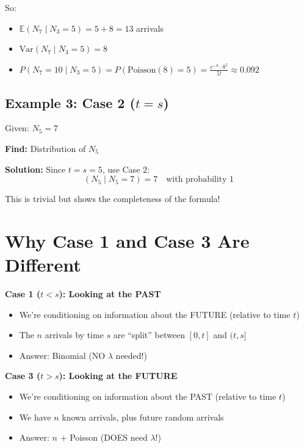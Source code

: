 \documentclass[11pt]{article}
\begin{document}
So:
\begin{itemize}
    \item $\mathbb{E}(N_7 \mid N_3 = 5) = 5 + 8 = 13$ arrivals
    \item $\text{Var}(N_7 \mid N_3 = 5) = 8$
    \item $P(N_7 = 10 \mid N_3 = 5) = P(\text{Poisson}(8) = 5) = \frac{e^{-8} \cdot 8^5}{5!} \approx 0.092$
\end{itemize}

\subsection{Example 3: Case 2 ($t = s$)}

Given: $N_5 = 7$

\textbf{Find:} Distribution of $N_5$

\textbf{Solution:} Since $t = s = 5$, use Case 2:
\[
(N_5 \mid N_5 = 7) = 7 \quad \text{with probability 1}
\]

This is trivial but shows the completeness of the formula!

\section{Why Case 1 and Case 3 Are Different}

\begin{tcolorbox}[colback=gray!10!white,colframe=gray!75!black,title=Key Difference]
\textbf{Case 1 ($t < s$): Looking at the PAST}
\begin{itemize}
    \item We're conditioning on information about the FUTURE (relative to time $t$)
    \item The $n$ arrivals by time $s$ are ``split'' between $[0,t]$ and $(t,s]$
    \item Answer: Binomial (NO $\lambda$ needed!)
\end{itemize}

\vspace{0.3cm}

\textbf{Case 3 ($t > s$): Looking at the FUTURE}
\begin{itemize}
    \item We're conditioning on information about the PAST (relative to time $t$)
    \item We have $n$ known arrivals, plus future random arrivals
    \item Answer: $n$ + Poisson (DOES need $\lambda$!)
\end{itemize}
\end{tcolorbox}
\end{document}
